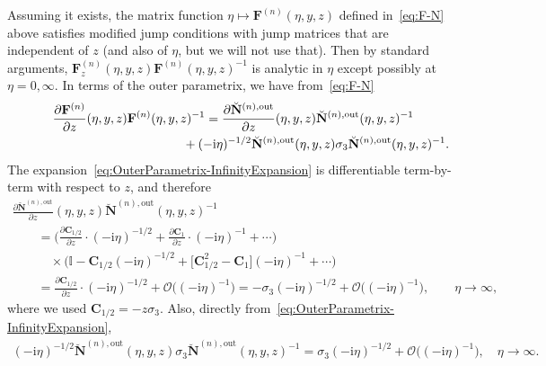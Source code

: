 \documentclass[pdftex]{sigma}
\numberwithin{equation}{section}
\begin{document}
Assuming it exists, the matrix function $\eta\mapsto \mathbf{F}^{(n)}(\eta,y,z)$ defined in~\eqref{eq:F-N} above satisfies modified jump conditions with jump matrices that are independent of $z$ (and also of $\eta$, but we will not use that). Then by standard arguments, $\mathbf{F}^{(n)}_z(\eta,y,z)\mathbf{F}^{(n)}(\eta,y,z)^{-1}$ is analytic in $\eta$ except possibly at $\eta=0,\infty$. In terms of the outer parametrix, we have from~\eqref{eq:F-N}
\begin{gather*}
\frac{\partial\mathbf{F}^{(n)}}{\partial z}(\eta,y,z)\mathbf{F}^{(n)}(\eta,y,z)^{-1} = \frac{\partial\breve{\mathbf{N}}^{(n),\mathrm{out}}}{\partial z}(\eta,y,z)\breve{\mathbf{N}}^{(n),\mathrm{out}}(\eta,y,z)^{-1} \\
\hphantom{\frac{\partial\mathbf{F}^{(n)}}{\partial z}(\eta,y,z)\mathbf{F}^{(n)}(\eta,y,z)^{-1} =}{}
+ (-\mathrm{i}\eta)^{-1/2}\breve{\mathbf{N}}^{(n),\mathrm{out}}(\eta,y,z)\sigma_3\breve{\mathbf{N}}^{(n),\mathrm{out}}(\eta,y,z)^{-1}.
\end{gather*}
The expansion~\eqref{eq:OuterParametrix-InfinityExpansion} is differentiable term-by-term with respect to $z$, and therefore
\begin{gather*}
\frac{\partial\breve{\mathbf{N}}^{(n),\mathrm{out}}}{\partial z} (\eta,y,z)\breve{\mathbf{N}}^{(n),\mathrm{out}}(\eta,y,z)^{-1}\\
 \qquad{}= \bigg(\frac{\partial\mathbf{C}_{1/2}}{\partial z} \cdot(-\mathrm{i}\eta)^{-1/2} +\frac{\partial\mathbf{C}_1}{\partial z}\cdot (-\mathrm{i}\eta)^{-1} + \cdots\bigg) \\
 \qquad\quad{} \times\bigl(\mathbb{I}-\mathbf{C}_{1/2}(-\mathrm{i}\eta)^{-1/2} + \big[\mathbf{C}_{1/2}^2-\mathbf{C}_1\big](-\mathrm{i}\eta)^{-1} + \cdots\bigr)\\
 \qquad{} = \frac{\partial \mathbf{C}_{1/2}}{\partial z}\cdot (-\mathrm{i}\eta)^{-1/2} + \mathcal{O}\bigl((-\mathrm{i}\eta)^{-1}\bigr)
 = -\sigma_3(-\mathrm{i}\eta)^{-1/2}+\mathcal{O}\bigl((-\mathrm{i}\eta)^{-1}\bigr),\qquad\eta\to\infty,
\end{gather*}
where we used $\mathbf{C}_{1/2}=-z\sigma_3$. Also, directly from~\eqref{eq:OuterParametrix-InfinityExpansion},
\begin{gather*}
(-\mathrm{i}\eta)^{-1/2}\breve{\mathbf{N}}^{(n),\mathrm{out}}(\eta,y,z)\sigma_3\breve{\mathbf{N}}^{(n),\mathrm{out}}(\eta,y,z)^{-1}=\sigma_3 (-\mathrm{i}\eta)^{-1/2} + \mathcal{O}\bigl((-\mathrm{i}\eta)^{-1}\bigr),\quad\eta\to\infty.
\end{gather*}
\end{document}
